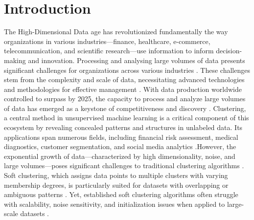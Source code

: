 \documentclass[twoside,11pt]{article}
\renewcommand{\cite}{\citep}
\begin{document}
\section{Introduction}
The High-Dimensional Data age has revolutionized fundamentally the way organizations in various industries—finance, healthcare, e-commerce, telecommunication, and scientific research—use information to inform decision-making and innovation. Processing and analysing large volumes of data presents significant challenges for organizations across various industries \cite{Kumar2023}. These challenges stem from the complexity and scale of data, necessitating advanced technologies and methodologies for effective management \cite{awrahman2022}. With data production worldwide controlled to surpass by 2025, the capacity to process and analyze large volumes of data has emerged as a keystone of competitiveness and discovery \cite{rusu2022} \cite{acciarini2023} \cite{badshah2024}. Clustering, a central method in unsupervised machine learning is a critical component of this ecosystem by revealing concealed patterns and structures in unlabeled data. Its applications span numerous fields, including financial risk assessment, medical diagnostics, customer segmentation, and social media analytics \cite{jain1999}.However, the exponential growth of data—characterized by high dimensionality, noise, and large volumes—poses significant challenges to traditional clustering algorithms \cite{benabdellah2019}\cite{henry2023}. Soft clustering, which assigns data points to multiple clusters with varying membership degrees, is particularly suited for datasets with overlapping or ambiguous patterns \cite{raut2011}\cite{li2024}. Yet, established soft clustering algorithms often struggle with scalability, noise sensitivity, and initialization issues when applied to large-scale datasets \cite{wu2024}\cite{everitt2011}.
\end{document}
